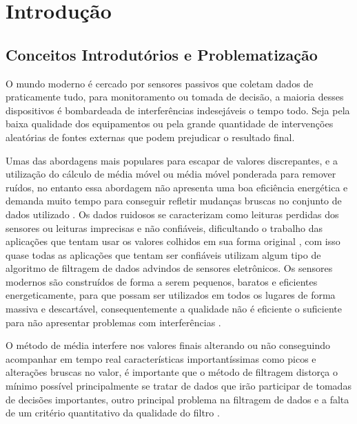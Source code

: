 
\chapter{Introdução}\label{intro}
\section{Conceitos Introdutórios e Problematização}

O mundo moderno é cercado por sensores passivos que coletam dados de praticamente tudo, para monitoramento ou tomada de decisão, a maioria desses dispositivos é bombardeada de interferências indesejáveis o tempo todo. Seja pela baixa qualidade dos equipamentos ou pela grande quantidade de intervenções aleatórias de fontes externas que podem prejudicar o resultado final.

Umas das abordagens mais populares para escapar de valores discrepantes, e a utilização do cálculo de média móvel ou média móvel ponderada para remover ruídos, no entanto essa abordagem não apresenta uma boa eficiência energética e demanda muito tempo para conseguir refletir mudanças bruscas no conjunto de dados utilizado \cite{International_Conference__Zhuang}. 
Os dados ruidosos se caracterizam como leituras perdidas dos sensores ou leituras imprecisas e não confiáveis, dificultando o trabalho das aplicações que tentam usar os valores colhidos em sua forma original \cite{Jeffery_Pipelined_Framework}, com isso quase todas as aplicações que tentam ser confiáveis utilizam algum tipo de algoritmo de filtragem de dados advindos de sensores eletrônicos.
Os sensores modernos são construídos de forma a serem pequenos, baratos e eficientes energeticamente, para que possam ser utilizados em todos os lugares de forma massiva e descartável, consequentemente a qualidade não é eficiente o suficiente para não apresentar problemas com interferências \cite{tan2005sensoclean}. 


O método de média interfere nos valores finais alterando ou não conseguindo acompanhar em tempo real características importantíssimas como picos e alterações bruscas no valor, é importante que o método de filtragem distorça o mínimo possível principalmente se tratar de dados que irão participar de tomadas de decisões importantes, outro principal problema na filtragem de dados e a falta de um critério quantitativo da qualidade do filtro \cite{kalambet2011noise}.





